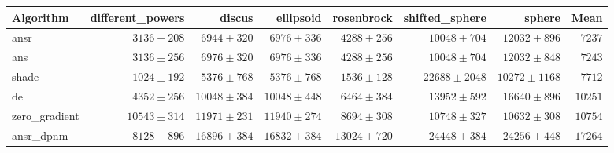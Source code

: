 \begin{tabular}{lrrrrrrr}
\toprule
Algorithm & different\_powers & discus & ellipsoid & rosenbrock & shifted\_sphere & sphere & Mean \\
\midrule
ansr & $3136 \pm 208$ & $6944 \pm 320$ & $6976 \pm 336$ & $4288 \pm 256$ & $10048 \pm 704$ & $12032 \pm 896$ & $7237$ \\
ans & $3136 \pm 256$ & $6976 \pm 320$ & $6976 \pm 336$ & $4288 \pm 256$ & $10048 \pm 704$ & $12032 \pm 848$ & $7243$ \\
shade & $1024 \pm 192$ & $5376 \pm 768$ & $5376 \pm 768$ & $1536 \pm 128$ & $22688 \pm 2048$ & $10272 \pm 1168$ & $7712$ \\
de & $4352 \pm 256$ & $10048 \pm 384$ & $10048 \pm 448$ & $6464 \pm 384$ & $13952 \pm 592$ & $16640 \pm 896$ & $10251$ \\
zero\_gradient & $10543 \pm 314$ & $11971 \pm 231$ & $11940 \pm 274$ & $8694 \pm 308$ & $10748 \pm 327$ & $10632 \pm 308$ & $10754$ \\
ansr\_dpnm & $8128 \pm 896$ & $16896 \pm 384$ & $16832 \pm 384$ & $13024 \pm 720$ & $24448 \pm 384$ & $24256 \pm 448$ & $17264$ \\
\bottomrule
\end{tabular}
